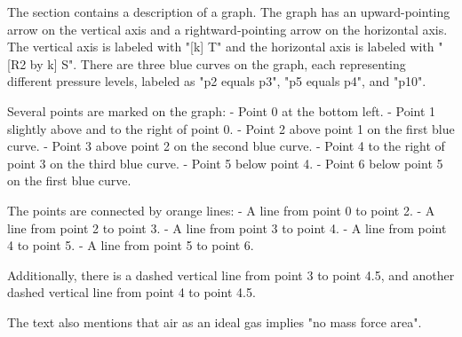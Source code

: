 The section contains a description of a graph. The graph has an upward-pointing arrow on the vertical axis and a rightward-pointing arrow on the horizontal axis. The vertical axis is labeled with "[k] T" and the horizontal axis is labeled with "[R2 by k] S". There are three blue curves on the graph, each representing different pressure levels, labeled as "p2 equals p3", "p5 equals p4", and "p10".

Several points are marked on the graph:
- Point 0 at the bottom left.
- Point 1 slightly above and to the right of point 0.
- Point 2 above point 1 on the first blue curve.
- Point 3 above point 2 on the second blue curve.
- Point 4 to the right of point 3 on the third blue curve.
- Point 5 below point 4.
- Point 6 below point 5 on the first blue curve.

The points are connected by orange lines:
- A line from point 0 to point 2.
- A line from point 2 to point 3.
- A line from point 3 to point 4.
- A line from point 4 to point 5.
- A line from point 5 to point 6.

Additionally, there is a dashed vertical line from point 3 to point 4.5, and another dashed vertical line from point 4 to point 4.5.

The text also mentions that air as an ideal gas implies "no mass force area".